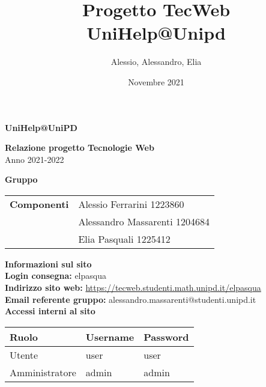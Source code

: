 \documentclass[a4paper, 11pt]{article}
\title{Progetto TecWeb \\ UniHelp@Unipd}
\author{Alessio, Alessandro, Elia}
\date{Novembre 2021}
\begin{document}
\begin{center}
	\textbf{\Huge{UniHelp@UniPD}}\\
\end{center}

\vspace{1.5cm}

\begin{center}
	\textbf{\huge{Relazione progetto Tecnologie Web}}\\[0.2cm]
	\Large{Anno 2021-2022}
\end{center}

\vspace{5pt}

\begin{center}
	\textbf{\Large{Gruppo}}
    \begin{table}[H]
        \hspace{3.5cm}
        \renewcommand{\arraystretch}{1.4}
        \begin{tabular}{l | l}
            \textbf{Componenti} & Alessio Ferrarini 1223860\\
            & Alessandro Massarenti 1204684\\
            & Elia Pasquali 1225412\\
        \end{tabular}
    \end{table}
\end{center}

\hspace{5pt}

\begin{center}
	\textbf{\Large{Informazioni sul sito}}\\
	\textbf{Login consegna:} elpasqua \\
	\textbf{Indirizzo sito web:} \url{https://tecweb.studenti.math.unipd.it/elpasqua}\\
	\textbf{Email referente gruppo:} alessandro.massarenti@studenti.unipd.it\\
    \vspace{1cm}
    \textbf{Accessi interni al sito}
    \begin{longtable}{|l|l|l|}
        \hline
        \rowcolor[HTML]{9B0014}
        {\color[HTML]{FFFFFF} Ruolo} & {\color[HTML]{FFFFFF} Username} & {\color[HTML]{FFFFFF} Password} \\ \hline
        Utente         & user     & user     \\ \hline
        Amministratore & admin    & admin \\ \hline
    \end{longtable}
\end{center}

\pagebreak
\tableofcontents
\pagebreak







\end{document}
